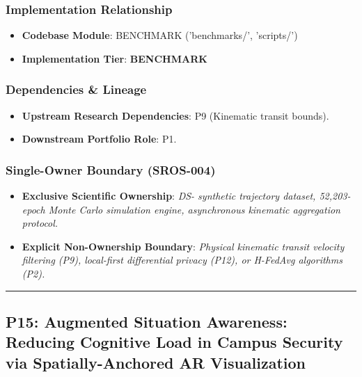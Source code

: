 \documentclass[11pt,letterpaper]{article}
\begin{document}
\subsubsection{Implementation Relationship}
\begin{itemize}[leftmargin=*]
    \item \raggedright \textbf{Codebase Module}: BENCHMARK ('benchmarks/\allowbreak ', 'scripts/\allowbreak ')
    \item \textbf{Implementation Tier}: \textbf{BENCHMARK}
\end{itemize}

\subsubsection{Dependencies \& Lineage}
\begin{itemize}[leftmargin=*]
    \item \textbf{Upstream Research Dependencies}: P9 (Kinematic transit bounds).
    \item \textbf{Downstream Portfolio Role}: P1.
\end{itemize}

\subsubsection{Single-Owner Boundary (SROS-004)}
\begin{itemize}[leftmargin=*]
    \item \textbf{Exclusive Scientific Ownership}: \textit{DS- synthetic trajectory dataset, 52,203-\allowbreak epoch Monte Carlo simulation engine, asynchronous kinematic aggregation protocol.}
    \item \textbf{Explicit Non-Ownership Boundary}: \textit{Physical kinematic transit velocity filtering (P9), local-\allowbreak first differential privacy (P12), or H-\allowbreak FedAvg algorithms (P2).}
\end{itemize}

\vspace{0.4cm}
\hrule

\subsection{P15: Augmented Situation Awareness: Reducing Cognitive Load in Campus Security via Spatially-\allowbreak Anchored AR Visualization}
\label{sec:profile_p15}
\end{document}
